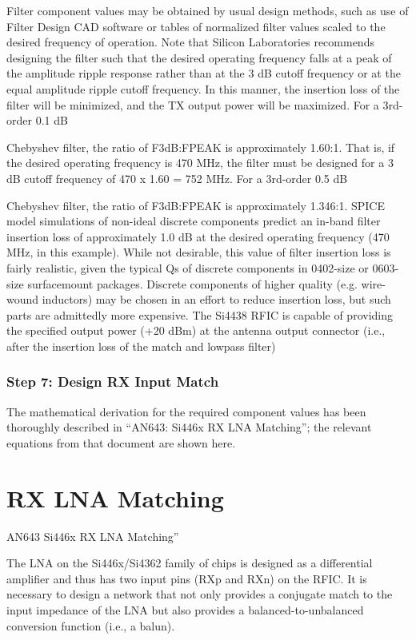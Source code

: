         Filter component values may be obtained by usual design methods, such as use of Filter Design CAD 
        software or tables of normalized filter values scaled to the desired frequency of operation. Note 
        that Silicon Laboratories recommends designing the filter such that the desired operating frequency 
        falls at a peak of the amplitude ripple response rather than at the 3 dB cutoff frequency or at the 
        equal amplitude ripple cutoff frequency. In this manner, the insertion loss of the filter will be 
        minimized, and the TX output power will be maximized. For a 3rd-order 0.1 dB
        
        Chebyshev filter, the ratio of F3dB:FPEAK is approximately 1.60:1. That is, if the desired 
        operating frequency is 470 MHz, the filter must be designed for a 3 dB cutoff frequency of 470 x 
        1.60 = 752 MHz. For a 3rd-order 0.5 dB
        
        Chebyshev filter, the ratio of F3dB:FPEAK is approximately 1.346:1. SPICE model simulations of 
        non-ideal discrete components predict an in-band filter insertion loss of approximately 1.0 dB at 
        the desired operating frequency (470 MHz, in this example). While not desirable, this value of 
        filter insertion loss is fairly realistic, given the typical Qs of discrete components in 0402-size 
        or 0603-size surfacemount packages. Discrete components of higher quality (e.g. wire-wound 
        inductors) may be chosen in an effort to reduce insertion loss, but such parts are admittedly more 
        expensive. The Si4438 RFIC is capable of providing the specified output power (+20 dBm) at the 
        antenna output connector (i.e., after the insertion loss of the match and lowpass filter)
        
      \subsubsection{Step 7: Design RX Input Match}
        The mathematical derivation for the required component values has been thoroughly described in 
        “AN643: Si446x RX LNA Matching”; the relevant equations from that document are shown here.
   
  \section{RX LNA Matching}
    AN643 Si446x RX LNA Matching”
  
    The LNA on the Si446x/Si4362 family of chips is designed as a differential amplifier and thus has two 
    input pins (RXp and RXn) on the RFIC. It is necessary to design a network that not only provides a 
    conjugate match to the input impedance of the LNA but also provides a balanced-to-unbalanced conversion 
    function (i.e., a balun).
    
